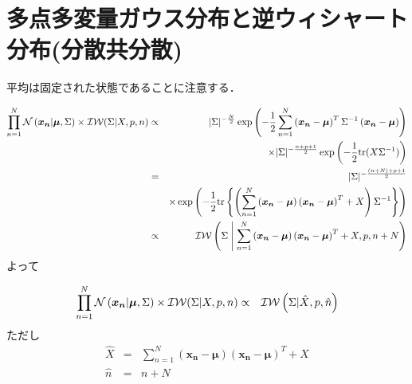 \documentclass[a4j]{jarticle}
\begin{document}
\section{多点多変量ガウス分布と逆ウィシャート分布(分散共分散)}
平均は固定された状態であることに注意する．

\begin{eqnarray}
\prod_{n=1}^{N}{\operatorname{\mathcal{N}}{(\boldsymbol{x_n} | \boldsymbol{\mu}, \Sigma)}} \times \operatorname{\mathcal{IW}}(\Sigma | X, p, n)
&\propto&
|\Sigma|^{-\frac{N}{2}} \exp{\left( -\frac{1}{2} \sum_{n=1}^{N}{\left( \boldsymbol{x_n} - \boldsymbol{\mu}\right)^T \Sigma^{-1} \left( \boldsymbol{x_n} - \boldsymbol{\mu}\right) }\right)} \nonumber\\
&&\times |\Sigma|^{-\frac{n+p+1}{2}}\exp{\left(-\frac{1}{2}  \textrm{tr}(X \Sigma^{-1})\right)}\\
&=& |\Sigma|^{-\frac{(n+N)+p+1}{2}} \nonumber \\
&&\times \exp{ \left( -\frac{1}{2}  \textrm{tr} \left\{ \left( \sum_{n=1}^{N}{\left( \boldsymbol{x_n} - \boldsymbol{\mu}\right) \left(\boldsymbol{x_n} - \boldsymbol{\mu}\right)^T} + X \right)\Sigma^{-1} \right\} \right) } \nonumber \\
&\propto& \operatorname{\mathcal{IW}}{\left( \Sigma \mathrel{}\middle|\mathrel{} \sum_{n=1}^{N}{\left( \boldsymbol{x_n} - \boldsymbol{\mu}\right) \left(\boldsymbol{x_n} - \boldsymbol{\mu}\right)^T} + X, p, n + N \right)}
\end{eqnarray}
よって
\begin{screen}
\begin{eqnarray}
\prod_{n=1}^{N}{\operatorname{\mathcal{N}}{(\boldsymbol{x_n} | \boldsymbol{\mu}, \Sigma)}} \times \operatorname{\mathcal{IW}}(\Sigma | X, p, n)
&\propto& 
\operatorname{\mathcal{IW}}{\left( \Sigma | \hat{X}, p, \hat{n} \right)}
\end{eqnarray}
ただし
\begin{eqnarray}
\hat{X} &=& \sum_{n=1}^{N}{\left( \boldsymbol{x_n} - \boldsymbol{\mu}\right) \left(\boldsymbol{x_n} - \boldsymbol{\mu}\right)^T} + X\\
\hat{n} &=& n + N
\end{eqnarray}
\end{screen}
\end{document}
